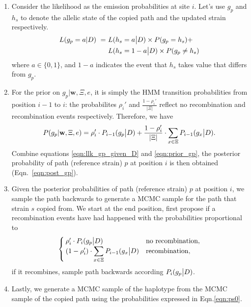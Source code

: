 \documentclass{bioinfo}
\begin{document}
\begin{enumerate}
\item Consider the likelihood as the emission probabilities at site $i$. Let's use $g_p$ and $h_s$ to denote the allelic state of the copied path and the updated strain respectively.
\begin{equation}
\begin{split}
L(g_p = a | D) ~ = ~ & L(h_s = a \big{|} D) \times P(g_p = h_s) + \\
                     & L(h_s = 1 - a \big{|} D) \times P(g_p \neq h_s) \label{eqn:llk_gp_given_D}
\end{split}
\end{equation}
where $a\in \{0,1\}$, and $1-a$ indicates the event that $h_s$ takes value that differs from $g_p$.

\item For the prior on $g_p|\mathbf{w}, \Xi, e$, it is simply the \citet{Li2003} HMM transition probabilities from position $i-1$ to $i$: the probabilites $\rho_i'$ and $\frac{1-\rho_i'}{|\Xi|}$ reflect no recombination and recombination events respectively. Therefore, we have
\begin{equation}
P(g_p|\mathbf{w}, \Xi, e) = \rho_i' \cdot P_{i-1}(g_p \big{|} D)  +  \frac{1-\rho_i'}{|\Xi|} \cdot \displaystyle\sum_{x\in \Xi} P_{i-1} (g_x \big{|} D).\label{eqn:prior_gp}
\end{equation}
Combine equations \eqref{eqn:llk_gp_given_D} and \eqref{eqn:prior_gp}, the posterior probability of path (reference strain) $p$ at position $i$ is then obtained (Eqn.~\eqref{eqn:post_gp}).

\item Given the posterior probabilities of path (reference strain) $p$ at position $i$, we sample the path backwards to generate a MCMC sample for the path that strain $s$ copied from. We start at the end position, first propose if a recombination events have had happened with the probabilities proportional to
$$
\begin{cases}
\rho_i' \cdot P_i(g_p \big{|} D) & \text{no recombination},\\
\displaystyle ( 1-\rho_i' ) \cdot \sum_{x\in \Xi} P_{i-1}(g_x \big{|} D) & \text{recombination},
\end{cases}
$$
if it recombines, sample path backwards according $P_i(g_p \big{|} D)$.

\item Lastly, we generate a MCMC sample of the haplotype from the MCMC sample of the copied path using the probabilities expressed in Eqn.\eqref{eqn:ps0}.
\end{enumerate}
\end{document}
